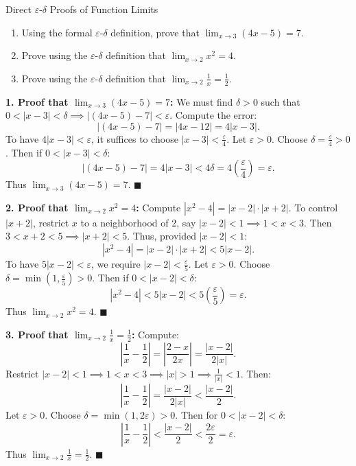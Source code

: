 \begin{exercise}{Direct $\varepsilon$-$\delta$ Proofs of Function Limits}
\begin{enumerate}[leftmargin=1.5em,itemsep=2pt]
  \item Using the formal $\varepsilon$-$\delta$ definition, prove that $\lim_{x \to 3} (4x - 5) = 7$.
  \item Prove using the $\varepsilon$-$\delta$ definition that $\lim_{x \to 2} x^2 = 4$.
  \item Prove using the $\varepsilon$-$\delta$ definition that $\lim_{x \to 2} \frac{1}{x} = \frac{1}{2}$.
\end{enumerate}
\end{exercise}

\begin{tabletworkspace}[5.0cm]
\end{tabletworkspace}

\begin{solution}
\textbf{1. Proof that $\lim_{x \to 3} (4x - 5) = 7$:}
We must find $\delta > 0$ such that $0 < |x - 3| < \delta \implies |(4x - 5) - 7| < \varepsilon$.
Compute the error:
\[
|(4x - 5) - 7| = |4x - 12| = 4|x - 3|.
\]
To have $4|x - 3| < \varepsilon$, it suffices to choose $|x - 3| < \frac{\varepsilon}{4}$.
Let $\varepsilon > 0$. Choose $\delta = \frac{\varepsilon}{4} > 0$.
Then if $0 < |x - 3| < \delta$:
\[
|(4x - 5) - 7| = 4|x - 3| < 4\delta = 4\left(\frac{\varepsilon}{4}\right) = \varepsilon.
\]
Thus $\lim_{x \to 3} (4x - 5) = 7$. \hfill $\blacksquare$

\textbf{2. Proof that $\lim_{x \to 2} x^2 = 4$:}
Compute $|x^2 - 4| = |x - 2| \cdot |x + 2|$.
To control $|x + 2|$, restrict $x$ to a neighborhood of 2, say $|x - 2| < 1 \implies 1 < x < 3$.
Then $3 < x + 2 < 5 \implies |x + 2| < 5$.
Thus, provided $|x - 2| < 1$:
\[
|x^2 - 4| = |x - 2| \cdot |x + 2| < 5|x - 2|.
\]
To have $5|x - 2| < \varepsilon$, we require $|x - 2| < \frac{\varepsilon}{5}$.
Let $\varepsilon > 0$. Choose $\delta = \min\left(1, \frac{\varepsilon}{5}\right) > 0$.
Then if $0 < |x - 2| < \delta$:
\[
|x^2 - 4| < 5|x - 2| < 5\left(\frac{\varepsilon}{5}\right) = \varepsilon.
\]
Thus $\lim_{x \to 2} x^2 = 4$. \hfill $\blacksquare$

\textbf{3. Proof that $\lim_{x \to 2} \frac{1}{x} = \frac{1}{2}$:}
Compute:
\[
\left| \frac{1}{x} - \frac{1}{2} \right| = \left| \frac{2 - x}{2x} \right| = \frac{|x - 2|}{2|x|}.
\]
Restrict $|x - 2| < 1 \implies 1 < x < 3 \implies |x| > 1 \implies \frac{1}{|x|} < 1$.
Then:
\[
\left| \frac{1}{x} - \frac{1}{2} \right| = \frac{|x - 2|}{2|x|} < \frac{|x - 2|}{2}.
\]
Let $\varepsilon > 0$. Choose $\delta = \min(1, 2\varepsilon) > 0$.
Then for $0 < |x - 2| < \delta$:
\[
\left| \frac{1}{x} - \frac{1}{2} \right| < \frac{|x - 2|}{2} < \frac{2\varepsilon}{2} = \varepsilon.
\]
Thus $\lim_{x \to 2} \frac{1}{x} = \frac{1}{2}$. \hfill $\blacksquare$
\end{solution}

